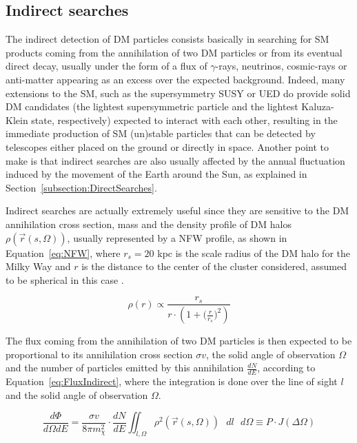\documentclass[a4paper, 10pt, openright]{report}
\begin{document}
\subsection{Indirect searches}

The indirect detection of \ac{DM} particles consists basically in searching for \ac{SM} products coming from the annihilation of two \ac{DM} particles or from its eventual direct decay, usually under the form of a flux of $\gamma$-rays, neutrinos, cosmic-rays or anti-matter appearing as an excess over the expected background. Indeed, many extensions to the \ac{SM}, such as the supersymmetry SUSY or \ac{UED} do provide solid \ac{DM} candidates (the lightest supersymmetric particle and the lightest Kaluza-Klein state, respectively) expected to interact with each other, resulting in the immediate production of \ac{SM} (un)stable particles that can be detected by telescopes either placed on the ground or directly in space. Another point to make is that indirect searches are also usually affected by the annual fluctuation induced by the movement of the Earth around the Sun, as explained in Section~\ref{subsection:DirectSearches}.

Indirect searches are actually extremely useful since they are sensitive to the \ac{DM} annihilation cross section, mass and the density profile of \ac{DM} halos $\rho(\overrightarrow{r}(s, \Omega))$, usually represented by a \ac{NFW} profile, as shown in Equation~\ref{eq:NFW}, where $r_s = 20$ kpc is the scale radius of the \ac{DM} halo for the Milky Way and $r$ is the distance to the center of the cluster considered, assumed to be spherical in this case \cite{FluxIndirect}.

\begin{equation}
\label{eq:NFW}
\rho(r) \propto \frac{r_s}{r \cdot \left (1+\big (\frac{r}{r_s} \big)^2 \right )}
\end{equation} 

The flux coming from the annihilation of two \ac{DM} particles is then expected to be proportional to its annihilation cross section $\sigma v$, the solid angle of observation $\Omega$ and the number of particles emitted by this annihilation $\frac{dN}{dE}$, according to Equation~\ref{eq:FluxIndirect}, where the integration is done over the line of sight $l$ and the solid angle of observation $\Omega$.

\begin{equation}
\label{eq:FluxIndirect}
\frac{d \Phi}{d\Omega dE} = \frac{\sigma v}{8 \pi m_\chi^2} \cdot \frac{dN}{dE} \iint_{l, \Omega} \rho^2(\overrightarrow{r}(s, \Omega)) \text{ } dl \text{ } d\Omega \equiv P \cdot J(\Delta \Omega)
\end{equation} 
\end{document}
